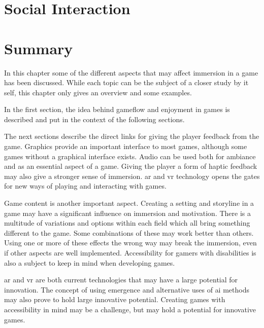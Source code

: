 \section{Social Interaction}

\section{Summary}
In this chapter some of the different aspects that may affect immersion in a game has been discussed.
While each topic can be the subject of a closer study by it self, this chapter only gives an overview and some examples.

In the first section, the idea behind gameflow and enjoyment in games is described and put in the context of the following sections.

The next sections describe the direct links for giving the player feedback from the game.
Graphics provide an important interface to most games, although some games without a graphical interface exists.
Audio can be used both for ambiance and as an essential aspect of a game.
Giving the player a form of haptic feedback may also give a stronger sense of immersion.
\gls{ar} and \gls{vr} technology opens the gates for new ways of playing and interacting with games.

Game content is another important aspect.
Creating a setting and storyline in a game may have a significant influence on immersion and motivation.
There is a multitude of variations and options within each field which all bring something different to the game.
Some combinations of these may work better than others.
Using one or more of these effects the wrong way may break the immersion, even if other aspects are well implemented.
Accessibility for gamers with disabilities is also a subject to keep in mind when developing games.

\gls{ar} and \gls{vr} are both current technologies that may have a large potential for innovation.
The concept of using emergence and alternative uses of \gls{ai} methods may also prove to hold large innovative potential.
Creating games with accessibility in mind may be a challenge, but may hold a potential for innovative games.
